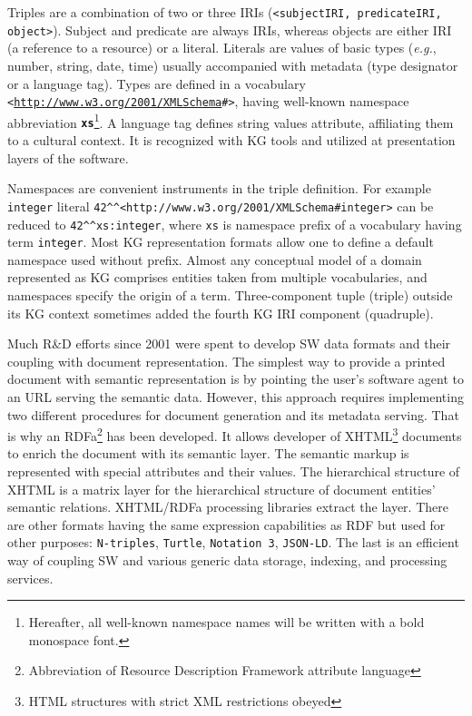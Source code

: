 \documentclass[
]{ceurart}
\newcommand{\ns}[1]{\textbf{\texttt{#1}}}
\begin{document}
Triples are a combination of two or three IRIs (\texttt{<subjectIRI, predicateIRI, object>}).  Subject and predicate are always IRIs, whereas objects are either IRI (a reference to a resource) or a literal.  Literals are values of basic types (\emph{e.g.}, number, string, date, time) usually accompanied with metadata (type designator or a language tag).  Types are defined in a vocabulary \texttt{<\url{http://www.w3.org/2001/XMLSchema}\#>}, having well-known namespace abbreviation \ns{xs}\footnote{Hereafter, all well-known namespace names will be written with a bold monospace font.}.  A language tag defines string values attribute, affiliating them to a cultural context.  It is recognized with KG tools and utilized at presentation layers of the software.

Namespaces are convenient instruments in the triple definition.  For example \verb|integer| literal \verb|42^^<http://www.w3.org/2001/XMLSchema#integer>| can be reduced to \verb|42^^xs:integer|, where \verb|xs| is namespace prefix of a vocabulary having term \verb|integer|.  Most KG representation formats allow one to define a default namespace used without prefix.  Almost any conceptual model of a domain represented as KG comprises entities taken from multiple vocabularies, and namespaces specify the origin of a term.  Three-component tuple (triple) outside its KG context sometimes added the fourth KG IRI component (quadruple).

Much R\&D efforts since 2001 \cite{tbl} were spent to develop SW data formats and their coupling with document representation.  The simplest way to provide a printed document with semantic representation is by pointing the user's software agent to an URL serving the semantic data.  However, this approach requires implementing two different procedures for document generation and its metadata serving.  That is why an RDFa\footnote{Abbreviation of Resource Description Framework attribute language} has been developed.  It allows developer of XHTML\footnote{HTML structures with strict XML restrictions obeyed} documents to enrich the document with its semantic layer.  The semantic markup is represented with special attributes and their values.  The hierarchical structure of XHTML is a matrix layer for the hierarchical structure of document entities' semantic relations.  XHTML/RDFa processing libraries extract the layer.  There are other formats having the same expression capabilities as RDF but used for other purposes: \texttt{N-triples}, \texttt{Turtle}, \texttt{Notation~3}, \texttt{JSON-LD}.  The last is an efficient way of coupling SW and various generic data storage, indexing, and processing services.
\end{document}
